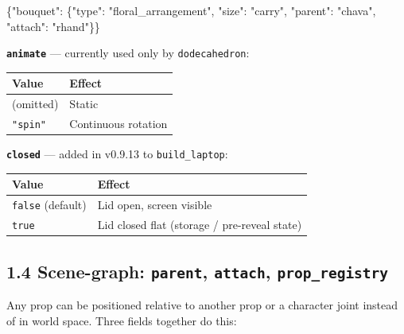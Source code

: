 \documentclass[
  11pt,
]{book}
\newenvironment{Shaded}{}{}
\newcommand{\DataTypeTok}[1]{\textcolor[rgb]{0.56,0.13,0.00}{#1}}
\newcommand{\FunctionTok}[1]{\textcolor[rgb]{0.02,0.16,0.49}{#1}}
\newcommand{\StringTok}[1]{\textcolor[rgb]{0.25,0.44,0.63}{#1}}
\begin{document}
\begin{Shaded}
\begin{Highlighting}[]
\FunctionTok{\{}\DataTypeTok{"bouquet"}\FunctionTok{:} \FunctionTok{\{}\DataTypeTok{"type"}\FunctionTok{:} \StringTok{"floral\_arrangement"}\FunctionTok{,} \DataTypeTok{"size"}\FunctionTok{:} \StringTok{"carry"}\FunctionTok{,}
             \DataTypeTok{"parent"}\FunctionTok{:} \StringTok{"chava"}\FunctionTok{,} \DataTypeTok{"attach"}\FunctionTok{:} \StringTok{"rhand"}\FunctionTok{\}\}}
\end{Highlighting}
\end{Shaded}

\textbf{\texttt{animate}} --- currently used only by
\texttt{dodecahedron}:

\begin{longtable}[]{@{}ll@{}}
\toprule\noalign{}
Value & Effect \\
\midrule\noalign{}
\endhead
\bottomrule\noalign{}
\endlastfoot
(omitted) & Static \\
\texttt{"spin"} & Continuous rotation \\
\end{longtable}

\textbf{\texttt{closed}} --- added in v0.9.13 to \texttt{build\_laptop}:

\begin{longtable}[]{@{}ll@{}}
\toprule\noalign{}
Value & Effect \\
\midrule\noalign{}
\endhead
\bottomrule\noalign{}
\endlastfoot
\texttt{false} (default) & Lid open, screen visible \\
\texttt{true} & Lid closed flat (storage / pre-reveal state) \\
\end{longtable}

\subsection{\texorpdfstring{1.4 Scene-graph: \texttt{parent},
\texttt{attach},
\texttt{prop\_registry}}{1.4 Scene-graph: parent, attach, prop\_registry}}\label{scene-graph-parent-attach-prop_registry}

Any prop can be positioned relative to another prop or a character joint
instead of in world space. Three fields together do this:
\end{document}
